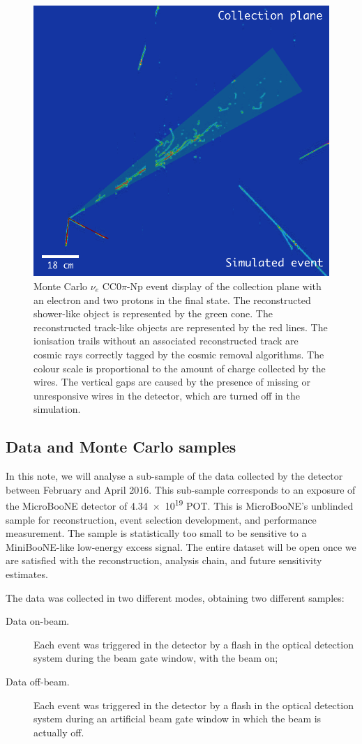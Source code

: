 \begin{figure}[htbp]
	\begin{center}
    	\includegraphics[width=0.5\linewidth]{figures/evd.png}
    	\caption{Monte Carlo $\nu_{e}$ CC0$\pi$-Np event display of the collection plane with an electron and two protons in the final state. The reconstructed shower-like object is represented by the green cone. The reconstructed track-like objects are represented by the red lines. The ionisation trails without an associated reconstructed track are cosmic rays correctly tagged by the cosmic removal algorithms. The colour scale is proportional to the amount of charge collected by the wires. {The vertical gaps are caused by the presence of missing or unresponsive wires in the detector, which are turned off in the simulation.}} \label{fig:evd}
	\end{center}
\end{figure}

\subsection{Data and Monte Carlo samples}\label{sec:data}
In this note, we will analyse a sub-sample of the data collected by the detector between February and April 2016. This sub-sample corresponds to an exposure of the MicroBooNE detector of \num{4.34e19} POT. This is MicroBooNE's unblinded sample for reconstruction, event selection development, and performance measurement. The sample is statistically too small to be sensitive to a MiniBooNE-like low-energy excess signal. 
The entire dataset will be open once we are satisfied with the reconstruction, analysis chain, and future sensitivity estimates.

The data was collected in two different modes, obtaining two different samples:
\begin{description}
\item[Data on-beam.] Each event was triggered in the detector by a flash in the optical detection system during the beam gate window, with the beam on;
\item[Data off-beam.] Each event was triggered in the detector by a flash in the optical detection system during an artificial beam gate window in which the beam is actually off.
\end{description}

